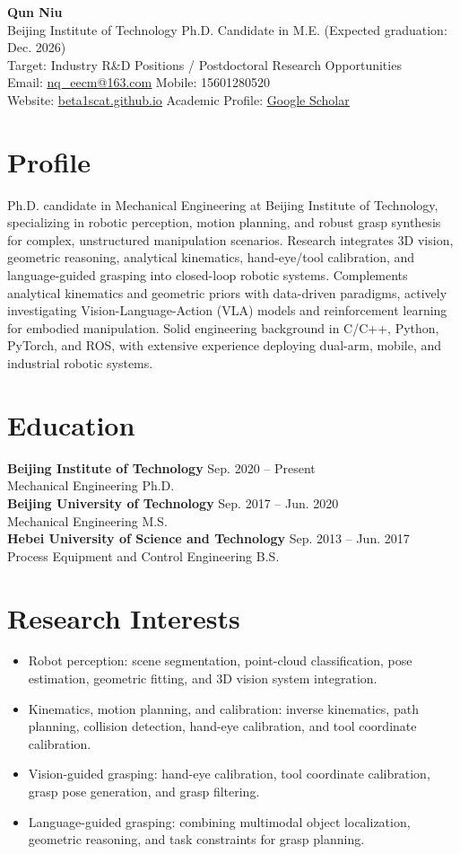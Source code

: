 \documentclass[11pt,a4paper]{article}
\newcommand{\entry}[4]{%
  \textbf{#1} \hfill #2\\
  {\color{textgray}#3} \hfill {#4}\\[-2pt]
}
\newcommand{\textlink}[2]{\href{#1}{\color{linkblue}\underline{#2}}}
\begin{document}
{\LARGE\bfseries\color{titlecolor} Qun Niu}\\[4pt]
Beijing Institute of Technology \quad Ph.D. Candidate in M.E. (Expected graduation: Dec. 2026)\\
Target: Industry R\&D Positions / Postdoctoral Research Opportunities\\
Email: \textlink{mailto:nq_eecm@163.com}{nq\_eecm@163.com} \quad Mobile: 15601280520\\
Website: \textlink{https://beta1scat.github.io/}{beta1scat.github.io} \quad Academic Profile: \textlink{https://scholar.google.com/citations?hl=en\&user=6E4Hd8UAAAAJ}{Google Scholar}

\section*{Profile}
Ph.D. candidate in Mechanical Engineering at Beijing Institute of Technology, specializing in robotic perception, motion planning, and robust grasp synthesis for complex, unstructured manipulation scenarios. Research integrates 3D vision, geometric reasoning, analytical kinematics, hand-eye/tool calibration, and language-guided grasping into closed-loop robotic systems. Complements analytical kinematics and geometric priors with data-driven paradigms, actively investigating Vision-Language-Action (VLA) models and reinforcement learning for embodied manipulation. Solid engineering background in C/C++, Python, PyTorch, and ROS, with extensive experience deploying dual-arm, mobile, and industrial robotic systems.

\section*{Education}
\entry{Beijing Institute of Technology}{Sep. 2020 -- Present}{Mechanical Engineering}{Ph.D.}
\entry{Beijing University of Technology}{Sep. 2017 -- Jun. 2020}{Mechanical Engineering}{M.S.}
\entry{Hebei University of Science and Technology}{Sep. 2013 -- Jun. 2017}{Process Equipment and Control Engineering}{B.S.}

\section*{Research Interests}
\begin{itemize}
	\item Robot perception: scene segmentation, point-cloud classification, pose estimation, geometric fitting, and 3D vision system integration.
	\item Kinematics, motion planning, and calibration: inverse kinematics, path planning, collision detection, hand-eye calibration, and tool coordinate calibration.
	\item Vision-guided grasping: hand-eye calibration, tool coordinate calibration, grasp pose generation, and grasp filtering.
	\item Language-guided grasping: combining multimodal object localization, geometric reasoning, and task constraints for grasp planning.
\end{itemize}
\end{document}
